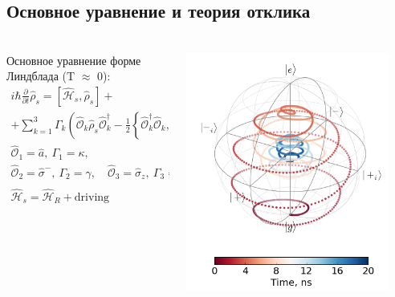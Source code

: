 \documentclass[aspectratio=169, 13pt]{beamer}
\newcommand{\sbrkt}[1]{\left[ #1 \right]}
\newcommand{\rbrkt}[1]{\left( #1 \right)}
\begin{document}
\subsection{Основное уравнение и теория отклика}
\begin{frame}[c]\frametitle{\secname}\framesubtitle{\subsecname}
\begin{columns}[c]

\begin{column}{0.5\textwidth}
Основное уравнение форме Линдблада (T $\approx$ 0):
\begin{gather*}
i\hbar \frac{\partial}{\partial t}\hat \rho_s = \sbrkt{\mathcal{\hat H}_s, \hat \rho_s} + \\
+ \sum_{k=1}^3 \Gamma_k \rbrkt{\mathcal{\hat O}_k \hat \rho_s \mathcal{\hat O}_k^\dag - \frac{1}{2} \left\{ \mathcal{\hat O}_k^\dag \mathcal{\hat O}_k, \hat \rho_s \right\} } \\
\mathcal{\hat O}_1 = \hat a,\ \Gamma_1 = \kappa,\\
\mathcal{\hat O}_2 = \hat \sigma^-,\ \Gamma_2 = \gamma, \quad 
\mathcal{\hat O}_3 = \hat \sigma_z,\ \Gamma_3 = \gamma_\phi, \\
\mathcal{\hat H}_s = \mathcal{\hat H}_R + \text{driving}
\end{gather*}
\end{column}


\begin{column}{0.5\textwidth}
\includegraphics[width=0.9\textwidth]{rabi_dynamics_bloch_rel}
\end{column}
\end{columns}

\end{frame}
\end{document}
